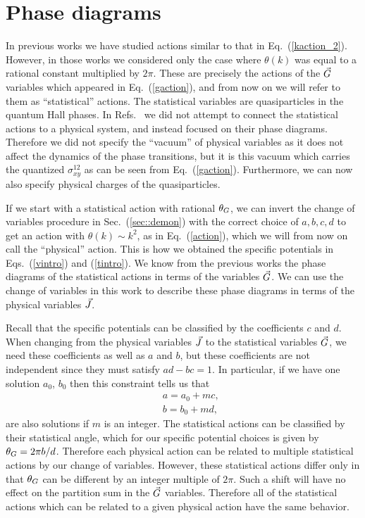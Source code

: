 \section{Phase diagrams}
\label{sec:reverse}

In previous works\cite{Loopy,short_range3,Gen2Loops} we have studied actions similar to that in Eq.~(\ref{kaction_2}). However, in those works we considered only the case where $\theta(k)$ was equal to a rational constant multiplied by $2\pi$. These are precisely the actions of the $\vec{G}$ variables which appeared in Eq.~(\ref{gaction}), and from now on we will refer to them as ``statistical'' actions. The statistical variables are quasiparticles in the quantum Hall phases.  In Refs.~\cite{Loopy, short_range3} we did not attempt to connect the statistical actions to a physical system, and instead focused on their phase diagrams.  Therefore we did not specify the ``vacuum'' of physical variables as it does not affect the dynamics of the phase transitions, but it is this vacuum which carries the quantized $\sigma^{12}_{xy}$ as can be seen from Eq.~(\ref{gaction}).  Furthermore, we can now also specify physical charges of the quasiparticles.  

If we start with a statistical action with rational $\theta_{G}$, we can invert the change of variables procedure in Sec.~(\ref{sec::demon}) with the correct choice of $a,b,c,d$ to get an action with $\theta(k)\sim k^2$, as in Eq.~(\ref{action}), which we will from now on call the ``physical'' action. This is how we obtained the specific potentials in Eqs.~(\ref{vintro}) and (\ref{tintro}). We know from the previous works the phase diagrams of the statistical actions in terms of the variables $\vec{G}$. We can use the change of variables in this work to describe these phase diagrams in terms of the physical variables $\vec{J}$. 

Recall that the specific potentials can be classified by the coefficients $c$ and $d$. When changing from the physical variables $\vec{J}$ to the statistical variables $\vec{G}$, we need these coefficients as well as $a$ and $b$, but these coefficients are not independent since they must satisfy $ad-bc=1$. In particular, if we have one solution $a_0$, $b_0$ then this constraint tells us that 
\begin{eqnarray}
&&a=a_0 + mc,\nonumber\\
&&b=b_0 + md,
\label{bshift} 
\end{eqnarray} 
are also solutions if $m$ is an integer.  The statistical actions can be classified by their statistical angle, which for our specific potential choices is given by $\theta_G=2\pi b/d$. Therefore each physical action can be related to multiple statistical actions by our change of variables. However, these statistical actions differ only in that $\theta_G$ can be different by an integer multiple of $2\pi$. Such a shift will have no effect on the partition sum in the $\vec{G}$ variables. Therefore all of the statistical actions which can be related to a given physical action have the same behavior. 

